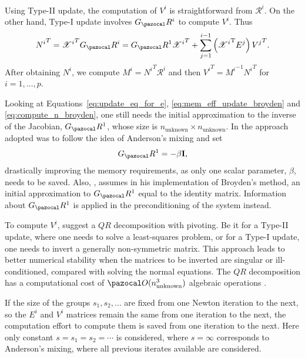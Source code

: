 Using Type-II update, the computation of \(V^{i}\) is straightforward from \(\mathscr{R}^{i}\).
On the other hand, Type-I update involves \(G_\pazocal R^{i}\) to compute \(V^{i}\).
Thus
\begin{equation} \label{eq:compute_n_broyden}
  {N^{i}}^T={\mathscr{X}^{i}}^T G_\pazocal R^{i}=G_\pazocal R^1 {\mathscr{X}^{i}}^T+\sum_{j=1}^{i-1}\left({\mathscr{X}^{i}}^{\mathrm{T}} E^{j}\right) {V^{j}}^T.
\end{equation}
After obtaining \(N^{i}\), we compute \(M^{i}={N^{i}}^T \mathscr{R}^{i}\) and then \({V^{i}}^T={M^{i}}^{-1} {N^{i}}^T\) for \(i=1, \ldots, p\).

Looking at Equations~\eqref{eq:update_eq_for_e}, \eqref{eq:mem_eff_update_broyden} and \eqref{eq:compute_n_broyden}, one still needs the initial approximation to the inverse of the Jacobian, \(G_\pazocal R^1\), whose size is \(n_\text{unknown}\times n_\text{unknown}\).
In \cite{fang_two_2009} the approach adopted was to follow the idea of Anderson's mixing and set
\begin{equation}
  G_\pazocal R^1 = - \beta \mathbf I,
\end{equation}
drastically improving the memory requirements, as only one scalar parameter, \(\beta\), needs to be saved.
Also, \cite{kelley_solving_2003}, assumes in his implementation of Broyden's method, an initial approximation to \(G_\pazocal R^1\) equal to the identity matrix.
Information about \(G_\pazocal R^1\) is applied in the preconditioning of the system instead.

To compute \(V^i\), \cite{fang_two_2009} suggest a \(QR\) decomposition with pivoting.
Be it for a Type-II update, where one needs to solve a least-squares problem, or for a Type-I update, one needs to invert a generally non-symmetric matrix.
This approach leads to better numerical stability when the matrices to be inverted are singular or ill-conditioned, compared with solving the normal equations.
The \(QR\) decomposition has a computational cost of \(\pazocal O(n_\text{unknown}^3)\) algebraic operations \citep{dennis_numerical_1996}.

If the size of the groups \(s_1, s_2,\dots\) are fixed from one Newton iteration to the next, so the \(E^i\) and \(V^i\) matrices remain the same from one iteration to the next, the computation effort to compute them is saved from one iteration to the next.
Here only constant \(s=s_1=s_2 =\cdots\) is considered, where \(s=\infty\) corresponds to Anderson's mixing, where all previous iterates available are considered.

